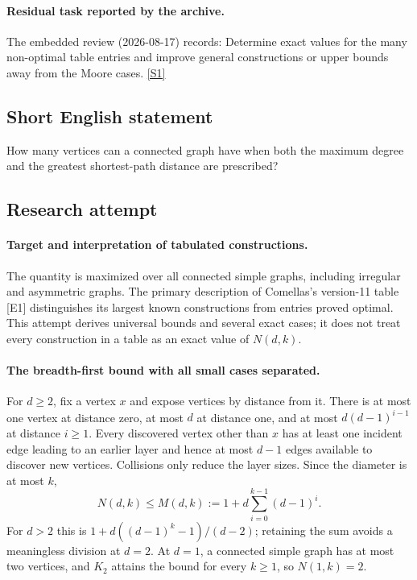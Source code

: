 \documentclass[11pt,a4paper]{article}
\newcommand{\sref}[2]{\hyperlink{source:#1:#2}{[S#2]}}
\begin{document}
\paragraph{Residual task reported by the archive.}

The embedded review (2026-08-17) records: Determine exact values for the many non-optimal table entries and improve general constructions or upper bounds away from the Moore cases. \sref{1412}{1}

\subsection{Short English statement}

How many vertices can a connected graph have when both the maximum degree and the greatest shortest-path distance are prescribed?

\subsection{Research attempt}

\paragraph{Target and interpretation of tabulated constructions.}
The quantity is maximized over all connected simple graphs, including
irregular and asymmetric graphs. The primary description of Comellas's
version-11 table [E1] distinguishes its largest known constructions
from entries proved optimal. This attempt derives universal bounds and
several exact cases; it does not treat every construction in a table as
an exact value of $N(d,k)$.

\paragraph{The breadth-first bound with all small cases separated.}
For $d\ge2$, fix a vertex $x$ and expose vertices by distance from it.
There is at most one vertex at distance zero, at most $d$ at distance
one, and at most $d(d-1)^{i-1}$ at distance $i\ge1$. Every discovered
vertex other than $x$ has at least one incident edge leading to an
earlier layer and hence at most $d-1$ edges available to discover new
vertices. Collisions only reduce the layer sizes. Since the diameter
is at most $k$,
\[
 N(d,k)\le M(d,k):=1+d\sum_{i=0}^{k-1}(d-1)^i.
\]
For $d>2$ this is $1+d((d-1)^k-1)/(d-2)$; retaining the sum
avoids a meaningless division at $d=2$. At $d=1$, a connected simple
graph has at most two vertices, and $K_2$ attains the bound for every
$k\ge1$, so $N(1,k)=2$.
\end{document}
